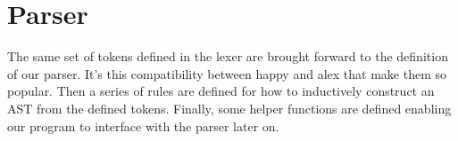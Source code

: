 \documentclass[12pt,a4paper]{report}
\theoremstyle{definition}
\theoremstyle{remark}
\begin{document}


\section{Parser}\label{appendix: parser}
The same set of tokens defined in the lexer are brought forward to the definition of our parser. It's this compatibility between happy and alex that make them so popular. Then a series of rules are defined for how to inductively construct an AST from the defined tokens. Finally, some helper functions are defined enabling our program to interface with the parser later on. 




%
\end{document}
